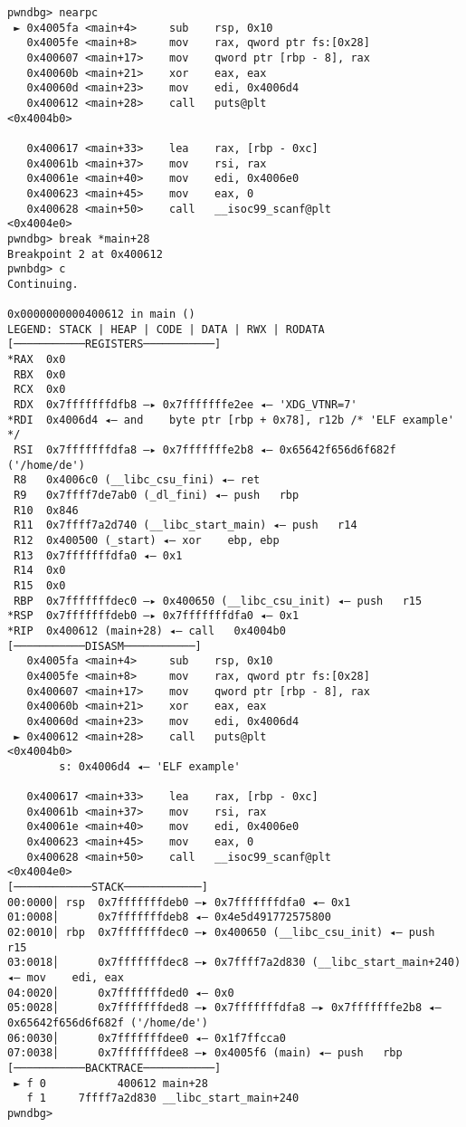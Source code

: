 \begin{lstlisting}
pwndbg> nearpc
 ► 0x4005fa <main+4>     sub    rsp, 0x10
   0x4005fe <main+8>     mov    rax, qword ptr fs:[0x28]
   0x400607 <main+17>    mov    qword ptr [rbp - 8], rax
   0x40060b <main+21>    xor    eax, eax
   0x40060d <main+23>    mov    edi, 0x4006d4
   0x400612 <main+28>    call   puts@plt                      <0x4004b0>
 
   0x400617 <main+33>    lea    rax, [rbp - 0xc]
   0x40061b <main+37>    mov    rsi, rax
   0x40061e <main+40>    mov    edi, 0x4006e0
   0x400623 <main+45>    mov    eax, 0
   0x400628 <main+50>    call   __isoc99_scanf@plt            <0x4004e0>
pwndbg> break *main+28
Breakpoint 2 at 0x400612
pwnbdg> c
Continuing.

0x0000000000400612 in main ()
LEGEND: STACK | HEAP | CODE | DATA | RWX | RODATA
[───────────REGISTERS───────────]
*RAX  0x0
 RBX  0x0
 RCX  0x0
 RDX  0x7fffffffdfb8 —▸ 0x7fffffffe2ee ◂— 'XDG_VTNR=7'
*RDI  0x4006d4 ◂— and    byte ptr [rbp + 0x78], r12b /* 'ELF example' */
 RSI  0x7fffffffdfa8 —▸ 0x7fffffffe2b8 ◂— 0x65642f656d6f682f ('/home/de')
 R8   0x4006c0 (__libc_csu_fini) ◂— ret    
 R9   0x7ffff7de7ab0 (_dl_fini) ◂— push   rbp
 R10  0x846
 R11  0x7ffff7a2d740 (__libc_start_main) ◂— push   r14
 R12  0x400500 (_start) ◂— xor    ebp, ebp
 R13  0x7fffffffdfa0 ◂— 0x1
 R14  0x0
 R15  0x0
 RBP  0x7fffffffdec0 —▸ 0x400650 (__libc_csu_init) ◂— push   r15
*RSP  0x7fffffffdeb0 —▸ 0x7fffffffdfa0 ◂— 0x1
*RIP  0x400612 (main+28) ◂— call   0x4004b0
[───────────DISASM───────────]
   0x4005fa <main+4>     sub    rsp, 0x10
   0x4005fe <main+8>     mov    rax, qword ptr fs:[0x28]
   0x400607 <main+17>    mov    qword ptr [rbp - 8], rax
   0x40060b <main+21>    xor    eax, eax
   0x40060d <main+23>    mov    edi, 0x4006d4
 ► 0x400612 <main+28>    call   puts@plt                      <0x4004b0>
        s: 0x4006d4 ◂— 'ELF example'
 
   0x400617 <main+33>    lea    rax, [rbp - 0xc]
   0x40061b <main+37>    mov    rsi, rax
   0x40061e <main+40>    mov    edi, 0x4006e0
   0x400623 <main+45>    mov    eax, 0
   0x400628 <main+50>    call   __isoc99_scanf@plt            <0x4004e0>
[────────────STACK────────────]
00:0000│ rsp  0x7fffffffdeb0 —▸ 0x7fffffffdfa0 ◂— 0x1
01:0008│      0x7fffffffdeb8 ◂— 0x4e5d491772575800
02:0010│ rbp  0x7fffffffdec0 —▸ 0x400650 (__libc_csu_init) ◂— push   r15
03:0018│      0x7fffffffdec8 —▸ 0x7ffff7a2d830 (__libc_start_main+240) ◂— mov    edi, eax
04:0020│      0x7fffffffded0 ◂— 0x0
05:0028│      0x7fffffffded8 —▸ 0x7fffffffdfa8 —▸ 0x7fffffffe2b8 ◂— 0x65642f656d6f682f ('/home/de')
06:0030│      0x7fffffffdee0 ◂— 0x1f7ffcca0
07:0038│      0x7fffffffdee8 —▸ 0x4005f6 (main) ◂— push   rbp
[───────────BACKTRACE───────────]
 ► f 0           400612 main+28
   f 1     7ffff7a2d830 __libc_start_main+240
pwndbg> 
\end{lstlisting}

